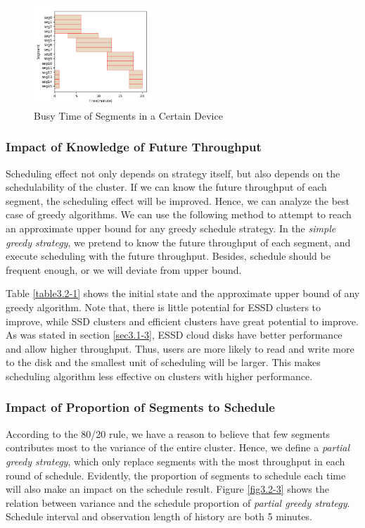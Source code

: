 \begin{figure}[ht]
    \centering
    \includegraphics[width=0.4\textwidth]{Figure-3.2/Figure_2.png}
    \caption{Busy Time of Segments in a Certain Device}
    \label{fig3.2-2}
\end{figure}


\subsubsection{Impact of Knowledge of Future Throughput}
\label{sec3.2-3}

Scheduling effect not only depends on strategy itself, but also depends on the schedulability of the cluster. If we can know the future throughput of each segment, the scheduling effect will be improved. Hence, we can analyze the best case of greedy algorithms. We can use the following method to attempt to reach an approximate upper bound for any greedy schedule strategy. In the \textit{simple greedy strategy}, we pretend to know the future throughput of each segment, and execute scheduling with the future throughput. Besides, schedule should be frequent enough, or we will deviate from upper bound.

Table \ref{table3.2-1} shows the initial state and the approximate upper bound of any greedy algorithm. Note that, there is little potential for ESSD clusters to improve, while SSD clusters and efficient clusters have great potential to improve. As was stated in section \ref{sec3.1-3}, ESSD cloud disks have better performance and allow higher throughput. Thus, users are more likely to read and write more to the disk and the smallest unit of scheduling will be larger. This makes scheduling algorithm less effective on clusters with higher performance.


\subsubsection{Impact of Proportion of Segments to Schedule}
\label{sec3.2-4}

According to the 80/20 rule, we have a reason to believe that few segments contributes most to the variance of the entire cluster. Hence, we define a \textit{partial greedy strategy}, which only replace segments with the most throughput in each round of schedule. Evidently, the proportion of segments to schedule each time will also make an impact on the schedule result. Figure \ref{fig3.2-3} shows the relation between variance and the schedule proportion of \textit{partial greedy strategy}. Schedule interval and observation length of history are both 5 minutes.

